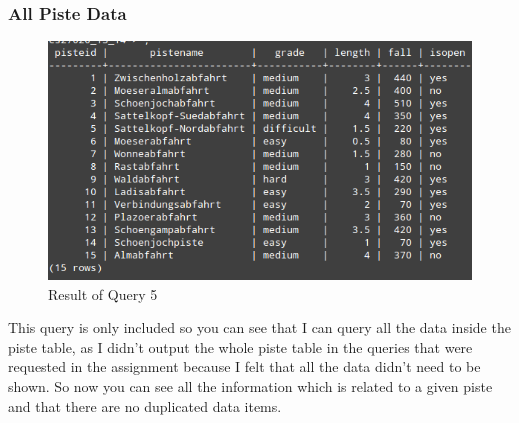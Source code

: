 \documentclass[12pt]{article}
\begin{document}
\subsubsection{All Piste Data}

\begin{figure}[htp]
\centering
\includegraphics[scale=0.545]{Screenshots/AllPiste.png}
\caption{Result of Query 5}
\label{Query of select all the Data from the Piste table}
\end{figure}
This query is only included so you can see that I can query all the data inside the piste table, as I didn't output the whole piste table in the queries that were requested in the assignment because I felt that all the data didn't need to be shown. So now you can see all the information which is related to a given piste and that there are no duplicated data items.
\end{document}
